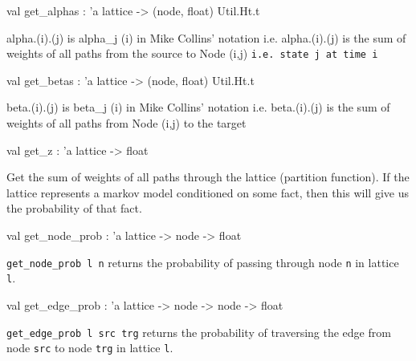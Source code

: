 \documentclass[11pt]{article}
\begin{document}
\label{val:Lattice.get-underscorealphas}\begin{ocamldoccode}
val get_alphas : 'a lattice -> (node, float) Util.Ht.t
\end{ocamldoccode}
\begin{ocamldocdescription}
alpha.(i).(j) is alpha\_j (i) in Mike Collins' notation
    i.e. alpha.(i).(j) is the sum of weights of all paths from the source to Node (i,j) 
    {\tt{i.e. state j at time i}}


\end{ocamldocdescription}




\label{val:Lattice.get-underscorebetas}\begin{ocamldoccode}
val get_betas : 'a lattice -> (node, float) Util.Ht.t
\end{ocamldoccode}
\begin{ocamldocdescription}
beta.(i).(j) is beta\_j (i) in Mike Collins' notation 
    i.e. beta.(i).(j) is the sum of weights of all paths from Node (i,j) to the target


\end{ocamldocdescription}




\label{val:Lattice.get-underscorez}\begin{ocamldoccode}
val get_z : 'a lattice -> float
\end{ocamldoccode}
\begin{ocamldocdescription}
Get the sum of weights of all paths through the lattice (partition function).
    If the lattice represents a markov model conditioned on some fact, then this
    will give us the probability of that fact.


\end{ocamldocdescription}




\label{val:Lattice.get-underscorenode-underscoreprob}\begin{ocamldoccode}
val get_node_prob : 'a lattice -> node -> float
\end{ocamldoccode}
\begin{ocamldocdescription}
{\tt{get\_node\_prob l n}} returns the probability of passing through node {\tt{n}} in 
    lattice {\tt{l}}.


\end{ocamldocdescription}




\label{val:Lattice.get-underscoreedge-underscoreprob}\begin{ocamldoccode}
val get_edge_prob : 'a lattice -> node -> node -> float
\end{ocamldoccode}
\begin{ocamldocdescription}
{\tt{get\_edge\_prob l src trg}} returns the probability of traversing the edge from 
    node {\tt{src}} to node {\tt{trg}} in lattice {\tt{l}}.


\end{ocamldocdescription}
\end{document}
